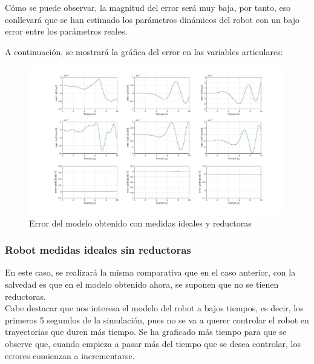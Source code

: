 Cómo se puede observar, la magnitud del error será muy baja, por tanto, eso conllevará que se han estimado los parámetros dinámicos del robot con un bajo error entre los parámetros reales.\\

\newpage

A continuación, se mostrará la gráfica del error en las variables articulares:



\begin{figure}[h!]

	\centering

	\includegraphics[width=1\textwidth]{EstimacParam_SisModError_In1_IdealCR}

	\caption{Error del modelo obtenido con medidas ideales y reductoras}

\end{figure}



\subsubsection{Robot medidas ideales sin reductoras}

En este caso, se realizará la misma comparativa que en el caso anterior, con la salvedad es que en el modelo obtenido ahora, se suponen que no se tienen reductoras.\\

Cabe destacar que nos interesa el modelo del robot a bajos tiempos, es decir, los primeros 5 segundos de la simulación, pues no se va a querer controlar el robot en trayectorias que duren más tiempo. Se ha graficado más tiempo para que se observe que, cuando empieza a pasar más del tiempo que se desea controlar, los errores comienzan a incrementarse.\\

